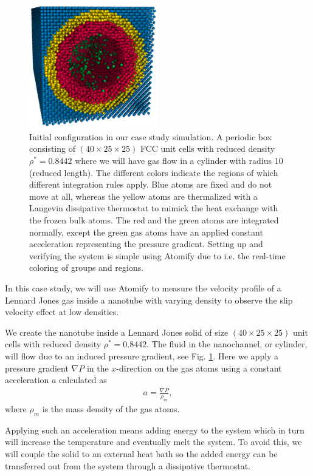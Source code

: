 \documentclass[aps,pre,twocolumn,letterpaper,floatfix,nofootinbib]{revtex4}
\begin{document}
\begin{figure}
	\centering
	\includegraphics[width=0.5\textwidth]{lj_flow/configuration.png}
	\caption{
		Initial configuration in our case study simulation.
		A periodic box consisting of $(40\times25\times25)$ FCC unit cells with reduced density $\rho^* = 0.8442$ where we will have gas flow in a cylinder with radius 10 (reduced length).
		The different colors indicate the regions of which different integration rules apply.
		Blue atoms are fixed and do not move at all,
		whereas the yellow atoms are thermalized with a Langevin\citep{schneider1978molecular} dissipative thermostat to mimick the heat exchange with the frozen bulk atoms.
		The red and the green atoms are integrated normally, except the green gas atoms have an applied constant acceleration representing the pressure gradient.
		Setting up and verifying the system is simple using Atomify due to i.e. the real-time coloring of groups and regions.
    }
	\label{fig:cylinder_simulation}
\end{figure}

In this case study, we will use Atomify to measure the velocity profile of a
Lennard Jones gas inside a nanotube with varying density to observe
the slip velocity effect at low densities.

We create the nanotube inside a Lennard Jones solid of size  $(40\times25\times25)$ unit cells with reduced density $\rho^* = 0.8442$.
The fluid in the nanochannel, or cylinder, will flow due to an induced pressure gradient, see Fig. \ref{fig:cylinder_simulation}.
Here we apply a pressure gradient $\nabla P$ in the $x$-direction on the gas atoms using a constant acceleration $a$ calculated as
\begin{align}
	a = \frac{\nabla P}{\rho_m},
\end{align}
where $\rho_m$ is the mass density of the gas atoms.

Applying such an acceleration means adding energy to the system which in turn will increase the temperature and eventually melt the system.
To avoid this, we will couple the solid to an external heat bath so the added energy can be transferred out from the system through a dissipative thermostat.
\end{document}
